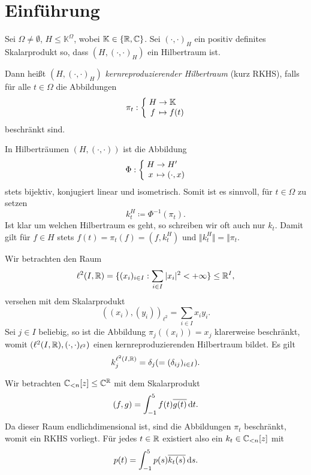 \section{Einführung}

\begin{definition}
    Sei $\Omega \neq \emptyset$, $H \leq \mathbb{K}^\Omega$, wobei $\mathbb{K} \in \{ \mathbb{R}, \mathbb{C} \}$. Sei $(\cdot, \cdot)_H$ ein positiv definites Skalarprodukt so, dass $(H, (\cdot, \cdot)_H)$ ein Hilbertraum ist.

    Dann heißt $(H, (\cdot, \cdot)_H)$ \emph{kernreproduzierender Hilbertraum} (kurz RKHS), falls für alle $t \in \Omega$ die Abbildungen
    $$ \mapping{\pi_t}{H & \to & \mathbb{K}}{f & \mapsto & f(t)} $$
    beschränkt sind.
\end{definition}

\begin{remark}
    In Hilberträumen $(H, (\cdot, \cdot))$ ist die Abbildung
    $$ \mapping{\Phi}{H & \to & H'}{x & \mapsto & (\cdot, x)} $$
    stets bijektiv, konjugiert linear und isometrisch. Somit ist es sinnvoll, für $t \in \Omega$ zu setzen
    $$ k_t^H \coloneqq \Phi^{-1}(\pi_t). $$
    Ist klar um welchen Hilbertraum es geht, so schreiben wir oft auch nur $k_t$.
    Damit gilt für $f \in H$ stets $ f(t) = \pi_t(f) = (f, k_t^H) $ und $\Vert k_t^H \Vert = \Vert \pi_t $.
\end{remark}

\begin{example}
    Wir betrachten den Raum
    $$ \ell^2(I, \mathbb{R}) = \{ (x_i)_{i \in I} : \sum_{i \in I} \vert x_i \vert^2 < +\infty \} \leq \mathbb{R}^I, $$
    versehen mit dem Skalarprodukt
    $$ ((x_i), (y_i))_{\ell^2} = \sum_{i \in I} x_i y_i. $$
    Sei $j \in I$ beliebig, so ist die Abbildung $\pi_j ((x_i)) = x_j$ klarerweise beschränkt, womit $(\ell^2(I, \mathbb{R}), (\cdot, \cdot)_{\ell^2})$ einen kernreproduzierenden Hilbertraum bildet. Es gilt
    $$ k_j^{\ell^2(I, \mathbb{R})} = \delta_j (= (\delta_{ij})_{i \in I}). $$
\end{example}

\begin{example}
    Wir betrachten $\mathbb{C}_{<n}[z] \leq \mathbb{C}^{\mathbb{R}}$ mit dem Skalarprodukt
    $$ (f, g) = \int_{-1}^5 f(t) \overline{g(t)} \mathop{}\!\mathrm{d} t. $$
    Da dieser Raum endlichdimensional ist, sind die Abbildungen $\pi_t$ beschränkt, womit ein RKHS vorliegt. Für jedes $t \in \mathbb{R}$ existiert also ein $k_t \in \mathbb{C}_{<n}[z]$ mit
    $$ p(t) = \int_{-1}^5 p(s) \overline{k_t(s)} \mathop{}\!\mathrm{d} s. $$
\end{example}

